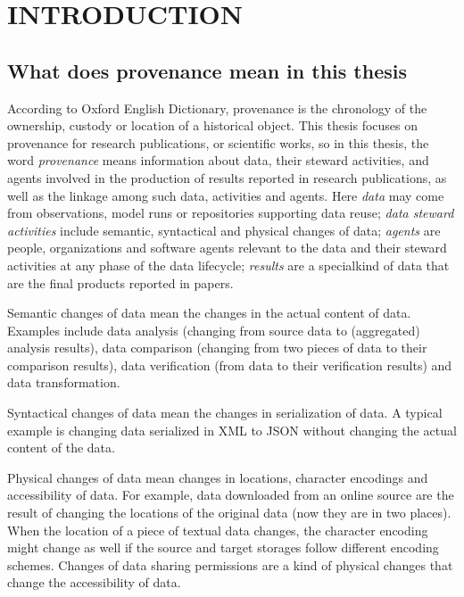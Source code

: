  
\chapter{INTRODUCTION}
\section{What does provenance mean in this thesis}
According to Oxford English Dictionary, provenance is the chronology of the ownership, custody or location of a historical object. This thesis focuses on provenance for research publications, or scientific works, so in this thesis, the word \emph{provenance} means information about data, their steward activities, and agents involved in the production of results reported in research publications, as well as the linkage among such data, activities and agents. Here \emph{data} may come from observations, model runs or repositories supporting data reuse; \emph{data steward activities} include semantic, syntactical and physical changes of data; \emph{agents} are people, organizations and software agents relevant to the data and their steward activities at any phase of the data lifecycle; \emph{results} are a specialkind of data that are the final products reported in papers.

Semantic changes of data mean the changes in the actual content of data. Examples include data analysis (changing from source data to (aggregated) analysis results), data comparison (changing from two pieces of data to their comparison results), data verification (from data to their verification results) and data transformation. 

Syntactical changes of data mean the changes in serialization of data. A typical example is changing data serialized in XML to JSON without changing the actual content of the data.

Physical changes of data mean changes in locations, character encodings and accessibility of data. For example, data downloaded from an online source are the result of changing the locations of the original data (now they are in two places). When the location of a piece of textual data changes, the character encoding might change as well if the source and target storages follow different encoding schemes. Changes of data sharing permissions are a kind of physical changes that change the accessibility of data. 

